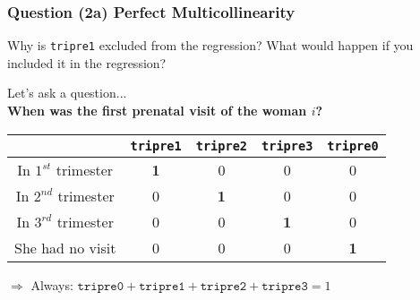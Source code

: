 \documentclass[11pt, xcolor=x11names,compress]{beamer}
\begin{document}
\begin{frame}[fragile,t]
\frametitle{Question (2a) Perfect Multicollinearity} 
Why is \texttt{tripre1} excluded from the regression? What would happen if you included it in the regression?

\vspace{5mm}

Let's ask a question...\\

\textbf{When was the first prenatal visit of the woman $i$?
}

\begin{center}
\setlength{\tabcolsep}{3pt}
\begin{tabular}{|c|c|c|c|c|}
\hline
& \texttt{tripre1} & \texttt{tripre2} & \texttt{tripre3} & \texttt{tripre0}
\\
\hline
In $1^{st}$ trimester & \textbf{1} & 0 & 0 & 0
\\
 \hline 
In $2^{nd}$ trimester & 0 & \textbf{1} & 0 & 0
\\
\hline 
In $3^{rd}$ trimester & 0 & 0 & \textbf{1} & 0
\\
\hline 
She had no visit & 0 & 0 & 0 & \textbf{1}
\\ \hline
\end{tabular}
\end{center}

$\Longrightarrow$ Always: $\texttt{tripre0} + \texttt{tripre1} + \texttt{tripre2} + \texttt{tripre3} = 1$
\end{frame}
\end{document}
